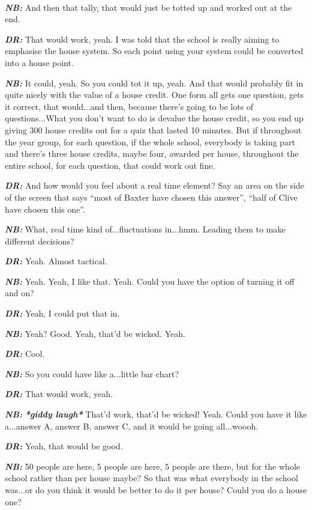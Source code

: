 \textit{\textbf{\\NB:}} And then that tally, that would just be totted up and worked out at the end.

\textit{\textbf{DR:}} That would work, yeah. I was told that the school is really aiming to emphasise the house system. So each point using your system could be converted into a house point.

\textit{\textbf{NB:}} It could, yeah. So you could tot it up, yeah. And that would probably fit in quite nicely with the value of a house credit. One form all gets one question, gets it correct, that would...and then, because there's going to be lots of questions...What you don't want to do is devalue the house credit, so you end up giving 300 house credits out for a quiz that lasted 10 minutes. But if throughout the year group, for each question, if the whole school, everybody is taking part and there's three house credits, maybe four, awarded per house, throughout the entire school, for each question, that could work out fine.

\textit{\textbf{DR:}} And how would you feel about a real time element? Say an area on the side of the screen that says ``most of Baxter have chosen this answer'', ``half of Clive have chosen this one''.

\textit{\textbf{NB:}} What, real time kind of...fluctuations in...hmm. Leading them to make different decisions?

\textit{\textbf{DR:}} Yeah. Almost tactical.

\textit{\textbf{NB:}} Yeah. Yeah, I like that. Yeah. Could you have the option of turning it off and on?

\textit{\textbf{DR:}} Yeah, I could put that in.

\textit{\textbf{NB:}} Yeah? Good. Yeah, that'd be wicked. Yeah.

\textit{\textbf{DR:}} Cool.

\textit{\textbf{NB:}} So you could have like a...little bar chart?

\textit{\textbf{DR:}} That would work, yeah.

\textit{\textbf{NB:}} \textit{\textbf{*giddy laugh*}} That'd work, that'd be wicked! Yeah. Could you have it like a...answer A, answer B, answer C, and it would be going all...woooh.

\textit{\textbf{DR:}} Yeah, that would be good.

\textit{\textbf{NB:}} 50 people are here, 5 people are here, 5 people are there, but for the whole school rather than per house maybe? So that was what everybody in the school was...or do you think it would be better to do it per house? Could you do a house one?

